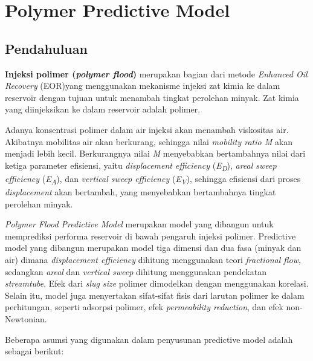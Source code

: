 \documentclass[
]{book}
\begin{document}
\hypertarget{polymer-predictive-model}{%
\chapter{Polymer Predictive Model}\label{polymer-predictive-model}}

\hypertarget{pendahuluan-3}{%
\section{Pendahuluan}\label{pendahuluan-3}}

\textbf{Injeksi polimer (\emph{polymer flood})} merupakan bagian dari metode \emph{Enhanced Oil Recovery} (EOR)yang menggunakan mekanisme injeksi zat kimia ke dalam reservoir dengan tujuan untuk menambah tingkat perolehan minyak. Zat kimia yang diinjeksikan ke dalam reservoir adalah
polimer.

Adanya konsentrasi polimer dalam air injeksi akan menambah viskositas air. Akibatnya mobilitas air akan berkurang, sehingga nilai \emph{mobility ratio M} akan menjadi lebih kecil. Berkurangnya nilai \emph{M} menyebabkan bertambahnya nilai dari ketiga parameter efisiensi, yaitu \emph{displacement efficiency} (\emph{E\textsubscript{D}}), \emph{areal sweep efficiency} (\emph{E\textsubscript{A}}), dan \emph{vertical sweep efficiency} (\emph{E\textsubscript{V}}), sehingga efisiensi dari proses \emph{displacement} akan bertambah, yang menyebabkan bertambahnya tingkat perolehan minyak.

\emph{Polymer Flood Predictive Model} merupakan model yang dibangun untuk memprediksi performa reservoir di bawah pengaruh injeksi polimer. Predictive model yang dibangun merupakan model tiga dimensi dan dua fasa (minyak dan air) dimana \emph{displacement efficiency} dihitung menggunakan teori \emph{fractional flow}, sedangkan \emph{areal} dan \emph{vertical sweep} dihitung menggunakan pendekatan \emph{streamtube}. Efek dari \emph{slug size} polimer dimodelkan dengan menggunakan korelasi. Selain itu, model juga menyertakan sifat-sifat fisis dari larutan polimer ke dalam perhitungan, seperti adsorpsi polimer, efek \emph{permeability reduction}, dan efek non-Newtonian.

Beberapa asumsi yang digunakan dalam penyusunan predictive model adalah sebagai berikut:
\end{document}
